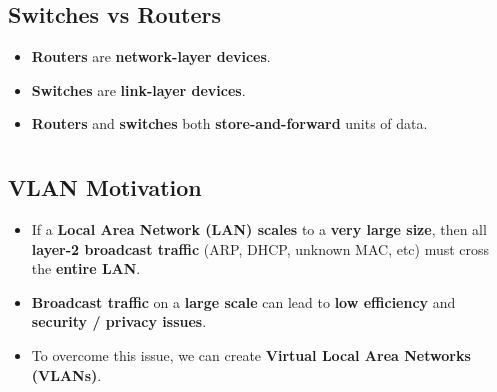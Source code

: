 \documentclass{article}
\begin{document}
    \subsection*{Switches vs Routers}
    \begin{itemize}
        \item \textbf{Routers} are \textbf{network-layer devices}.
        \item \textbf{Switches} are \textbf{link-layer devices}.
        \item \textbf{Routers} and \textbf{switches} both \textbf{store-and-forward} units of data.
    \end{itemize}

    \section*{}

    \subsection*{VLAN Motivation}
    \begin{itemize}
        \item If a \textbf{Local Area Network (LAN) scales} to a \textbf{very large size}, then all \textbf{layer-2 broadcast traffic} (ARP, DHCP, unknown MAC, etc) must cross the \textbf{entire LAN}.
        \item \textbf{Broadcast traffic} on a \textbf{large scale} can lead to \textbf{low efficiency} and \textbf{security / privacy issues}. 
        \item To overcome this issue, we can create \textbf{Virtual Local Area Networks (VLANs)}.
    \end{itemize}
\end{document}
